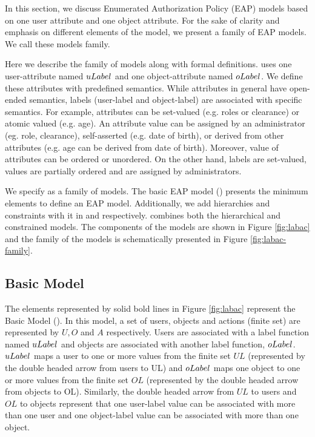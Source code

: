\label{sec:model}
In this section, we discuss Enumerated Authorization Policy (EAP) models based on one user attribute and one object attribute. For the sake of clarity and emphasis on different elements of the model, we present a family of EAP models. We call these models \eapABAC{} family.

Here we describe the \eapABAC{} family of models  along with formal definitions. \eapABAC{} uses one user-attribute named $uLabel$ and one object-attribute named $oLabel$. We define these attributes with predefined semantics. While attributes in general have open-ended semantics, labels (user-label and object-label) are associated with specific semantics. For example, attributes can be set-valued (e.g. roles or clearance) or atomic valued (e.g. age). An attribute value can be assigned by an administrator (eg. role, clearance), self-asserted (e.g. date of birth), or derived from other attributes (e.g. age can be derived from date of birth). Moreover, value of attributes can be ordered or unordered.  On the other hand, labels are set-valued, values are partially ordered and are assigned by administrators. 



We specify \eapABAC{} as a family of models. The basic EAP model (\clabac) presents the minimum elements to define an EAP model. Additionally, we add hierarchies and constraints with it in \hlabac{} and  \consLabac{} respectively.  \labacOneOneOne{} combines both the hierarchical and constrained models. The components of the \eapABAC{} models are shown in Figure \ref{fig:labac} and the family of the models is schematically presented in Figure \ref{fig:labac-family}.
	
	
\subsection{Basic \eapABAC{} Model}
The elements represented by solid bold lines in Figure \ref{fig:labac} represent the Basic \eapABAC{} Model (\clabac{}). In this model, a set of users, objects and actions (finite set) are represented by $U, O$ and $A$ respectively. Users are associated with a label function named $uLabel$ and objects are associated with another label function, $oLabel$. $uLabel$ maps a user to one or more values from the finite set  $UL$ (represented by the double headed arrow from users to UL) and $oLabel$ maps one object to one or more values from the finite set $OL$ (represented by the double headed arrow from objects to OL). Similarly, the double headed arrow from $UL$  to users and $OL$ to objects represent that one user-label value can be associated with more than one user and one object-label value can be associated with more than one object. 

